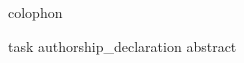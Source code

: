 
\maketitle%
{colophon}

\frontmatter%
\boldPDFchaptersfalse

{task}
{authorship_declaration}
{abstract}


\cleardoublepage %
\tableofcontents


\listoffigures%

\listoftables%

\listofexamples%

\listoflistings%


\boldPDFchapterstrue

